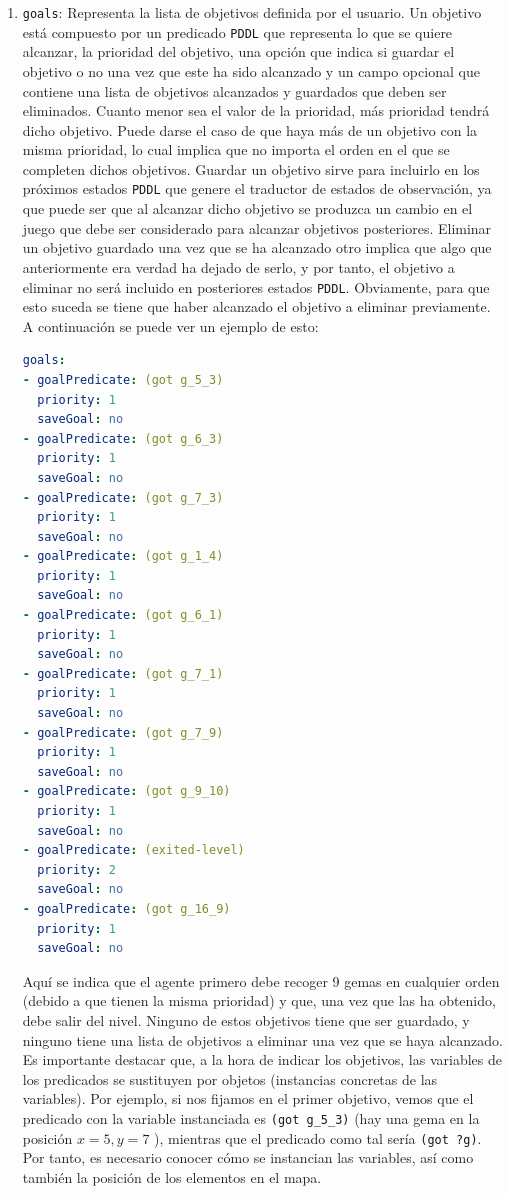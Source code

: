 \begin{enumerate}
    \item \texttt{goals}: Representa la lista de objetivos definida por el usuario. Un objetivo está compuesto
    por un predicado \texttt{PDDL} que representa lo que se quiere alcanzar, la prioridad del objetivo, una
    opción que indica si guardar el objetivo o no una vez que este ha sido alcanzado y un campo opcional
    que contiene una lista de objetivos alcanzados y guardados que deben ser eliminados. Cuanto menor
    sea el valor de la prioridad, más prioridad tendrá dicho objetivo. Puede darse el caso de que haya
    más de un objetivo con la misma prioridad, lo cual implica que no importa el orden en el que se
    completen dichos objetivos. Guardar un objetivo sirve para incluirlo en los próximos estados \texttt{PDDL}
    que genere el traductor de estados de observación, ya que puede ser que al alcanzar dicho objetivo
    se produzca un cambio en el juego que debe ser considerado para alcanzar objetivos posteriores.
    Eliminar un objetivo guardado una vez que se ha alcanzado otro implica que algo que anteriormente
    era verdad ha dejado de serlo, y por tanto, el objetivo a eliminar no será incluido en posteriores
    estados \texttt{PDDL}. Obviamente, para que esto suceda se tiene que haber alcanzado el objetivo a
    eliminar previamente. A continuación se puede ver un ejemplo de esto:
    
    \begin{lstlisting}[language=yaml]
goals:
- goalPredicate: (got g_5_3)
  priority: 1
  saveGoal: no
- goalPredicate: (got g_6_3)
  priority: 1
  saveGoal: no
- goalPredicate: (got g_7_3)
  priority: 1
  saveGoal: no
- goalPredicate: (got g_1_4)
  priority: 1
  saveGoal: no
- goalPredicate: (got g_6_1)
  priority: 1
  saveGoal: no
- goalPredicate: (got g_7_1)
  priority: 1
  saveGoal: no
- goalPredicate: (got g_7_9)
  priority: 1
  saveGoal: no
- goalPredicate: (got g_9_10)
  priority: 1
  saveGoal: no
- goalPredicate: (exited-level)
  priority: 2
  saveGoal: no
- goalPredicate: (got g_16_9)
  priority: 1
  saveGoal: no
    \end{lstlisting}
    
    Aquí se indica que el agente primero debe recoger 9 gemas en cualquier orden (debido a que tienen la misma
    prioridad) y que, una vez que las ha obtenido, debe salir del nivel. Ninguno de estos objetivos tiene que ser
    guardado, y ninguno tiene una lista de objetivos a eliminar una vez que se haya alcanzado. Es importante destacar
    que, a la hora de indicar los objetivos, las variables de los predicados se sustituyen por objetos (instancias
    concretas de las variables). Por ejemplo, si nos fijamos en el primer objetivo, vemos que el predicado con la
    variable instanciada es \texttt{(got g\_5\_3)} (hay una gema en la posición $x = 5, y= 7$ ), mientras que el
    predicado como tal sería \texttt{(got ?g)}. Por tanto, es necesario conocer cómo se instancian las variables,
    así como también la posición de los elementos en el mapa.
\end{enumerate}